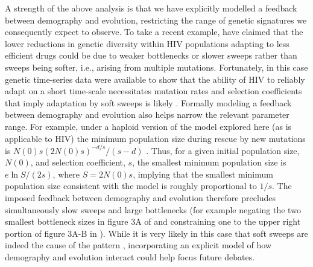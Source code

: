 \documentclass[]{article}
\begin{document}
A strength of the above analysis is that we have explicitly modelled a feedback between demography and evolution, restricting the range of genetic signatures we consequently expect to observe. 
To take a recent example, \cite{harris2018unfounded} have claimed that the lower reductions in genetic diversity within HIV populations adapting to less efficient drugs \citep[as observed by][]{feder2016more} could be due to weaker bottlenecks or slower sweeps rather than sweeps being softer, i.e., arising from multiple mutations. Fortunately, in this case genetic time-series data were available to show that the ability of HIV to reliably adapt on a short time-scale necessitates mutation rates and selection coefficients that imply adaptation by soft sweeps is likely \citep{feder2018clarifying}. 
Formally modeling a feedback between demography and evolution also helps narrow the relevant parameter range.
For example, under a haploid version of the model explored here (as is applicable to HIV) the minimum population size during rescue by new mutations is $N(0) s (2N(0)s)^{-d/s} / (s-d)$ \citep[equation 22 in][]{orr2014population}.
Thus, for a given initial population size, $N(0)$, and selection coefficient, $s$, the smallest minimum population size is $e \ln S / (2s)$, where $S=2N(0)s$, implying that the smallest minimum population size consistent with the model is roughly proportional to $1/s$.
The imposed feedback between demography and evolution therefore precludes simultaneously slow sweeps and large bottlenecks (for example negating the two smallest bottleneck sizes in figure 3A of \citealp{harris2018unfounded} and constraining one to the upper right portion of figure 3A-B in \citealp{feder2018clarifying}).
While it is very likely in this case that soft sweeps are indeed the cause of the pattern \citep{feder2018clarifying}, incorporating an explicit model of how demography and evolution interact could help focus future debates.
\end{document}
